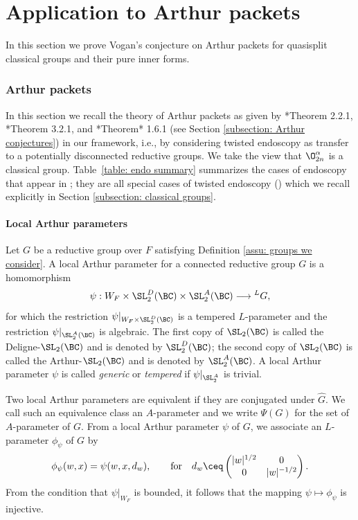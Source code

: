 \documentclass[11pt,letterpaper]{amsart}
\numberwithin{equation}{section}
\begin{document}
\part{Application to Arthur packets}\label{part: V Arthur}

In this section we prove Vogan's conjecture on Arthur packets for quasisplit classical groups and their pure inner forms.


\section{Arthur packets}\label{subsection: Arthur packets classical}


In this section we recall the theory of Arthur packets as given by \cite{Art13}*{Theorem 2.2.1}, \cite{Mok15}*{Theorem 3.2.1}, and \cite{KMSW14}*{Theorem* 1.6.1} (see Section \ref{subsection: Arthur conjectures}) in our framework, i.e., by considering twisted endoscopy as transfer to a potentially disconnected reductive groups. We take the view that $\O^{\alpha}_{2n}$ is a classical group.
Table~\ref{table: endo summary} summarizes the cases of endoscopy that appear in \cites{Art13,Mok15}; they are all special cases of twisted endoscopy (\cite{KS99}) which we recall explicitly in Section \ref{subsection: classical groups}. 

\subsection{Local Arthur parameters }\label{subsection: Arthur parameters}

Let $G$ be a reductive group over $F$ satisfying Definition \ref{assu: groups we consider}.
A local Arthur parameter for a connected reductive group $G$ is a homomorphism
$$\psi: W_F \times \SL_2^D(\BC) \times \SL_2^A(\BC) \longrightarrow {}^L{G},$$
for which the restriction $\psi|_{W_F \times \SL_2^D(\BC)}$ is a tempered $L$-parameter and the restriction $\psi|_{\SL_2^A(\BC)}$ is algebraic.
The first copy of $\SL_2(\BC)$ is called the Deligne-$\SL_2(\BC)$ and is denoted by $\SL_2^D(\BC)$; the second copy of $\SL_2(\BC)$ is called the Arthur-$\SL_2(\BC)$ and is denoted by $\SL_2^A(\BC)$. 
A local Arthur parameter $\psi$ is called {\it generic} or {\it tempered} if $\psi|_{\SL_2^A}$ is trivial. 

Two local Arthur parameters are equivalent if they are conjugated under $\widehat{G}$. We call such an equivalence class an $A$-parameter and we write $\Psi(G)$ for the set of $A$-parameter of $G$. From a local Arthur parameter $\psi$ of $G$, we associate an $L$-parameter $\phi_{\psi}$ of $G$ by
\begin{equation}\label{eqn: psi to phi psi}
\phi_\psi(w,x) = \psi(w,x,d_w), 
\qquad\text{for}\quad
d_w \ceq \begin{pmatrix}
    |w|^{1/2} & 0 \\
    0 & |w|^{-1/2}
\end{pmatrix}.
\end{equation}
From the condition that $\psi|_{W_F}$ is bounded, it follows that the mapping $\psi \mapsto \phi_{\psi}$ is injective.
\end{document}
